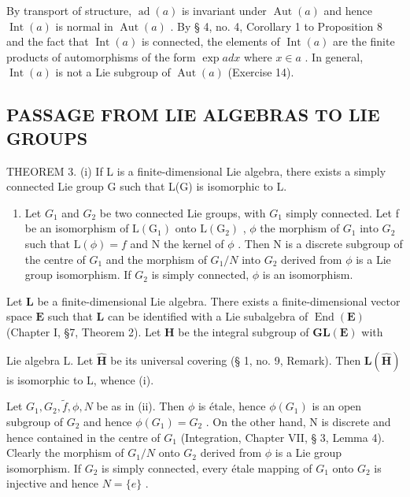 By transport of structure, \(\operatorname{ad}(a)\) is invariant under \(\operatorname{Aut}(a)\) and hence \(\operatorname{Int}(a)\) is normal in \(\operatorname{Aut}(a)\) . By § 4, no. 4, Corollary 1 to Proposition 8 and the fact that \(\operatorname{Int}(a)\) is connected, the elements of \(\operatorname{Int}(a)\) are the finite products of automorphisms of the form \(\exp ad x\) where \(x \in a\) . In general, \(\operatorname{Int}(a)\) is not a Lie subgroup of \(\operatorname{Aut}(a)\) (Exercise 14).

\subsection{PASSAGE FROM LIE ALGEBRAS TO LIE GROUPS}

THEOREM 3. (i) If L is a finite-dimensional Lie algebra, there exists a simply connected Lie group G such that L(G) is isomorphic to L.

\begin{enumerate}
\def\labelenumi{(\roman{enumi})}
\setcounter{enumi}{1}
\tightlist
\item
  Let \(G_{1}\) and \(G_{2}\) be two connected Lie groups, with \(G_{1}\) simply connected. Let f be an isomorphism of \(\mathrm{L}(\mathrm{G}_{1})\) onto \(\mathrm{L}(\mathrm{G}_{2})\) , \(\phi\) the morphism of \(G_{1}\) into \(G_{2}\) such that \(\mathrm{L}(\phi)=f\) and N the kernel of \(\phi\) . Then N is a discrete subgroup of the centre of \(G_{1}\) and the morphism of \(G_{1}/N\) into \(G_{2}\) derived from \(\phi\) is a Lie group isomorphism. If \(G_{2}\) is simply connected, \(\phi\) is an isomorphism.
\end{enumerate}

Let \(\mathbf{L}\) be a finite-dimensional Lie algebra. There exists a finite-dimensional vector space \(\mathbf{E}\) such that \(\mathbf{L}\) can be identified with a Lie subalgebra of \(\operatorname{End}(\mathbf{E})\) (Chapter I, §7, Theorem 2). Let \(\mathbf{H}\) be the integral subgroup of \(\mathbf{GL}(\mathbf{E})\) with

Lie algebra L. Let \(\hat{\mathbf{H}}\) be its universal covering (§ 1, no. 9, Remark). Then \(\mathbf{L}(\hat{\mathbf{H}})\) is isomorphic to L, whence (i).

Let \(G_{1}, G_{2}, \tilde{f}, \phi, N\) be as in (ii). Then \(\phi\) is étale, hence \(\phi(G_{1})\) is an open subgroup of \(G_{2}\) and hence \(\phi(G_{1}) = G_{2}\) . On the other hand, N is discrete and hence contained in the centre of \(G_{1}\) (Integration, Chapter VII, § 3, Lemma 4). Clearly the morphism of \(G_{1}/N\) onto \(G_{2}\) derived from \(\phi\) is a Lie group isomorphism. If \(G_{2}\) is simply connected, every étale mapping of \(G_{1}\) onto \(G_{2}\) is injective and hence \(N = \{e\}\) .

